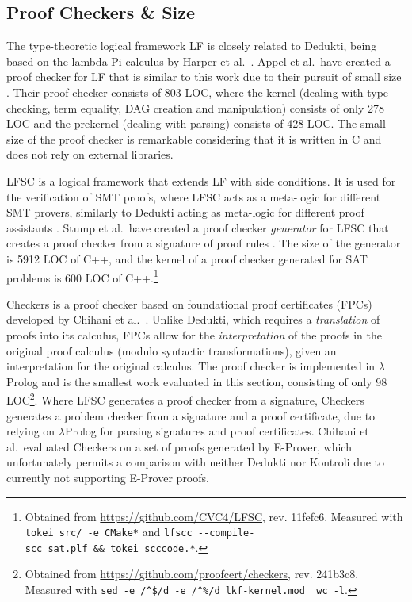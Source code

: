\documentclass[screen,sigplan,10pt]{acmart}
\begin{document}
\hypertarget{proof-checkers-size}{%
\subsection{Proof Checkers \& Size}\label{proof-checkers-size}}

The type-theoretic logical framework LF is closely related to Dedukti,
being based on the lambda-Pi calculus by Harper et
al.~\citep{DBLP:journals/jacm/HarperHP93}. Appel et al.~have created a
proof checker for LF that is similar to this work due to their pursuit
of small size \citep{DBLP:journals/jar/AppelMSV03}. Their proof checker
consists of 803 LOC, where the kernel (dealing with type checking, term
equality, DAG creation and manipulation) consists of only 278 LOC and
the prekernel (dealing with parsing) consists of 428 LOC. The small size
of the proof checker is remarkable considering that it is written in C
and does not rely on external libraries.

LFSC is a logical framework that extends LF with side conditions. It is
used for the verification of SMT proofs, where LFSC acts as a meta-logic
for different SMT provers, similarly to Dedukti acting as meta-logic for
different proof assistants \citep{DBLP:journals/fmsd/StumpORHT13}. Stump
et al.~have created a proof checker \emph{generator} for LFSC that
creates a proof checker from a signature of proof rules
\citep{stump2012}. The size of the generator is 5912 LOC of C++, and the
kernel of a proof checker generated for SAT problems is 600 LOC of
C++.\footnote{Obtained from \url{https://github.com/CVC4/LFSC}, rev.
  11fefc6. Measured with \texttt{tokei\ src/\ -e\ CMake*} and
  \texttt{lfscc\ -\/-compile-scc\ sat.plf\ \&\&\ tokei\ scccode.*}.}

Checkers is a proof checker based on foundational proof certificates
(FPCs) developed by Chihani et
al.~\citep{DBLP:conf/tableaux/ChihaniLR15}. Unlike Dedukti, which
requires a \emph{translation} of proofs into its calculus, FPCs allow
for the \emph{interpretation} of the proofs in the original proof
calculus (modulo syntactic transformations), given an interpretation for
the original calculus. The proof checker is implemented in
\(\lambda\)Prolog and is the smallest work evaluated in this section,
consisting of only 98 LOC\footnote{Obtained from
  \url{https://github.com/proofcert/checkers}, rev. 241b3c8. Measured
  with
  \texttt{sed\ -e\ \textquotesingle{}/\^{}\$/d\textquotesingle{}\ -e\ \textquotesingle{}/\^{}\%/d\textquotesingle{}\ lkf-kernel.mod\ \textbar{}\ wc\ -l}.}.
Where LFSC generates a proof checker from a signature, Checkers
generates a problem checker from a signature and a proof certificate,
due to relying on \(\lambda\)Prolog for parsing signatures and proof
certificates. Chihani et al.~evaluated Checkers on a set of proofs
generated by E-Prover, which unfortunately permits a comparison with
neither Dedukti nor Kontroli due to currently not supporting E-Prover
proofs.
\end{document}
